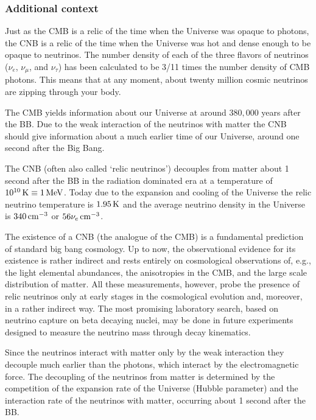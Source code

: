 \documentclass[a4paper,11pt]{article}
\begin{document}
\subsubsection{Additional context}

Just as the CMB is a relic of the time when the Universe was opaque to photons, the CNB is a relic of the time when the Universe was hot and dense enough to be opaque to neutrinos. The number density of each of the three flavors of neutrinos ($\nu_e$, $\nu_\mu$, and $\nu_\tau$) has been calculated to be 3/11 times the number density of CMB photons. This means that at any moment, about twenty million cosmic neutrinos are zipping through your body.

{\noindent}The CMB yields information about our Universe at around $380,000$ years after the BB. Due to the weak interaction of the neutrinos with matter the CNB should give information about a much earlier time of our Universe, around one second after the Big Bang.

{\noindent}The CNB (often also called `relic neutrinos') decouples from matter about 1 second after the BB in the radiation dominated era at a temperature of $10^{10}\,{\rm K}\equiv1\,{\rm MeV}$. Today due to the expansion and cooling of the Universe the relic neutrino temperature is $1.95\,{\rm K}$ and the average neutrino density in the Universe is $340\,{\rm cm^{-3}}$ or $56\nu_e\,{\rm cm^{-3}}$.

{\noindent}The existence of a CNB (the analogue of the CMB) is a fundamental prediction of standard big bang cosmology. Up to now, the observational evidence for its existence is rather indirect and rests entirely on cosmological observations of, e.g., the light elemental abundances, the anisotropies in the CMB, and the large scale distribution of matter. All these measurements, however, probe the presence of relic neutrinos only at early stages in the cosmological evolution and, moreover, in a rather indirect way. The most promising laboratory search, based on neutrino capture on beta decaying nuclei, may be done in future experiments designed to measure the neutrino mass through decay kinematics.

{\noindent}Since the neutrinos interact with matter only by the weak interaction they decouple much earlier than the photons, which interact by the electromagnetic force. The decoupling of the neutrinos from matter is determined by the competition of the expansion rate of the Universe (Hubble parameter) and the interaction rate of the neutrinos with matter, occurring about 1 second after the BB.
\end{document}
